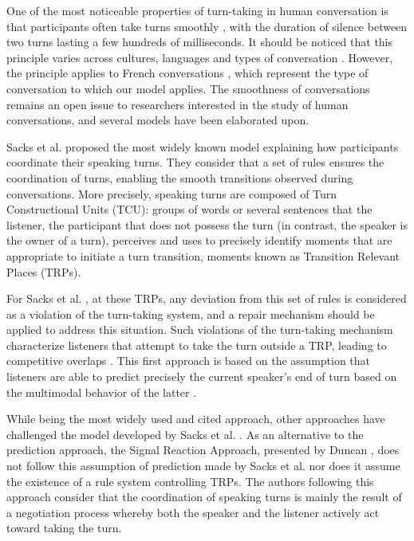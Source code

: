 \documentclass[twocolumn]{svjour3}
\begin{document}
One of the most noticeable properties of turn-taking in human conversation is that participants often take turns smoothly \citep{heldner_pauses_2010}, with the duration of silence between two turns lasting a few hundreds of milliseconds. 
It should be noticed that this principle varies across cultures, languages and types of conversation \citep{oconnell_turntaking_2008,stivers_universals_2009}.
However, the principle applies to French conversations \citep{mondada_multimodal_2007}, which represent the type of conversation to which our model applies.
The smoothness of conversations remains an open issue to researchers interested in the study of human conversations, and several models have been elaborated upon. 
 
Sacks et al. \citep{sacks_simplest_1974} proposed the most widely known model explaining how participants coordinate their spea\-king turns.
They consider that a set of rules ensures the coordination of turns, enabling the smooth transitions observed during conversations.
More precisely, speaking turns are composed of Turn Constructional Units (TCU): groups of words or several sentences that the listener, the participant that does not possess the turn (in contrast, the speaker is the owner of a turn), perceives and uses to precisely identify moments that are appropriate to initiate a turn transition, moments known as Transition Relevant Places (TRPs).

For Sacks et al. \citep{sacks_simplest_1974}, at these TRPs, any deviation from this set of rules is considered as a violation of the turn-taking system, and a repair mechanism should be applied to address this situation.
Such violations of the turn-taking mechanism characterize listeners that attempt to take the turn outside a TRP, leading to competitive overlaps \citep{schegloff_overlapping_2000}.
This first approach is based on the assumption that listeners are able to predict precisely the current speaker's end of turn based on the multimodal behavior of the latter \citep{de_ruiter_projecting_2006,french_turncompetitive_1983,ford_interactional_1996,mondada_multimodal_2007}. 

While being the most widely used and cited approach, other approaches have challenged the model developed by Sacks et al. \citep{sacks_simplest_1974}.
As an alternative to the prediction approach, the Signal Reaction Approach, presented by Duncan \citep{duncan_signals_1972}, does not follow this assumption of prediction made by Sacks et al. nor does it assume the existence of a rule system controlling TRPs. 
The authors following this approach consider that the coordination of speaking turns is mainly the result of a negotiation process whereby both the speaker and the listener actively act toward taking the turn.
\end{document}

